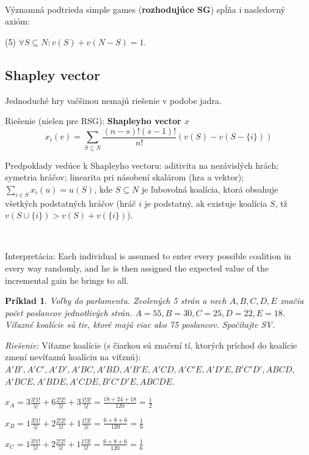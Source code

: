 \documentclass[a5paper,12pt]{article}
\newtheorem*{exampl}{Pr\'iklad}
\begin{document}
      \

      V\'yznamn\'a podtrieda simple games ({\bf rozhoduj\'uce SG}) sp\'l\v{n}a i nasledovn\'y axi\'om:

      (5)  $\forall S \subseteq N: v(S) + v(N - S)= 1$.

    \subsection{Shapley vector}
      Jednoduch\'e hry va\v{c}\v{s}inou nemaj\'u rie\v{s}enie v podobe jadra.

      Rie\v{s}enie (nielen pre RSG): {\bf Shapleyho vector $x$}
      \[x_{i}(v)=\sum_{S \subseteq N}\frac{(n-s)!(s-1)!}{n!}(v(S)-v(S-\{i\}))\]

      Predpoklady ved\'uce k Shapleyho vectoru: aditivita na nez\'avisl\'ych hr\'ach; symetria hr\'a\v{c}ov; linearita pri n\'asoben\'i skal\'arom (hra a vektor); $\sum_{i \in S} x_{i}(u) = u(S)$, kde $S \subseteq N$ je \v{l}ubovoln\'a koal\'icia, ktor\'a obsahuje v\v{s}etk\'ych podstatn\'ych hr\'a\v{c}ov (hr\'a\v{c} $i$ je podstatn\'y, ak existuje koal\'icia $S$, t\v{z} $v(S \cup \{i\})> v(S) + v(\{i\})$).

      \

      Interpret\'acia: Each individual is assumed to enter every possible coalition in every way randomly, and he is then assigned the expected value of the incremental gain he brings to all.

      \begin{exampl}
      Vo\v{l}by do parlamentu. Zvolen\'ych 5 str\'an a nech $A,B,C,D,E$ zna\v{c}ia po\v{c}et poslancov jednotliv\'ych str\'an. $A=55, B=30, C=25, D=22, E=18$. V\'i\v{t}azn\'e koal\'icie s\'u tie, ktor\'e maj\'u viac ako 75 poslancov. Spo\v{c}\'itajte SV.
      \end{exampl}

      \emph{Rie\v{s}enie:} V\'i\v{t}azne koal\'icie (s \v{c}iarkou s\'u zna\v{c}en\'i t\'i, ktor\'ych pr\'ichod do koal\'icie zmen\'i nev\'i\v{t}azn\'u koal\'iciu na v\'i\v{t}zn\'u): $A'B', A'C', A'D', A'BC, A'BD, A'B'E, A'CD, A'C'E, A'D'E, B'C'D', ABCD,$ $ A'BCE, A'BDE, A'CDE, B'C'D'E, ABCDE$.

      $x_{A} = 3 \frac{3!1!}{5!} + 6 \frac{2!2!}{5!} + 3 \frac{1!3!}{5!}= \frac{18+24+18}{120}=\frac{1}{2}$

      $x_{B} = 1 \frac{3!1!}{5!} + 2 \frac{2!2!}{5!} + 1 \frac{1!3!}{5!}= \frac{6+8+6}{120} = \frac{1}{6}$

      $x_{C} = 1 \frac{3!1!}{5!} + 2 \frac{2!2!}{5!} + 1 \frac{1!3!}{5!}= \frac{6+8+6}{120} = \frac{1}{6}$
\end{document}
